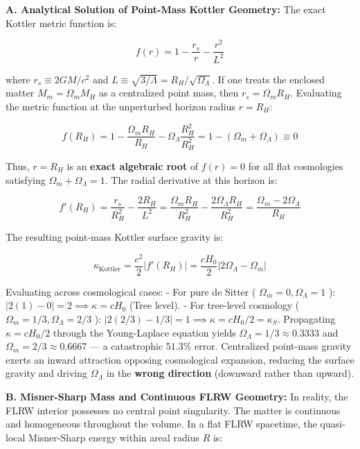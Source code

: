 \documentclass[11pt,a4paper]{article}
\theoremstyle{definition}\newtheorem{definition}{Definition}
\theoremstyle{remark}\newtheorem{remark}{Remark}
\begin{document}
\textbf{A. Analytical Solution of Point-Mass Kottler Geometry:}
The exact Kottler metric function is:


\begin{equation}
f(r) = 1 - \frac{r_s}{r} - \frac{r^2}{L^2}
\end{equation}


where $r_s \equiv 2GM/c^2$ and $L \equiv \sqrt{3/\Lambda} = R_H / \sqrt{\Omega_\Lambda}$. If one treats the enclosed matter $M_m = \Omega_m M_H$ as a centralized point mass, then $r_s = \Omega_m R_H$. Evaluating the metric function at the unperturbed horizon radius $r = R_H$:


\begin{equation}
f(R_H) = 1 - \frac{\Omega_m R_H}{R_H} - \Omega_\Lambda \frac{R_H^2}{R_H^2} = 1 - (\Omega_m + \Omega_\Lambda) \equiv 0
\end{equation}


Thus, $r = R_H$ is an \textbf{exact algebraic root} of $f(r) = 0$ for all flat cosmologies satisfying $\Omega_m + \Omega_\Lambda = 1$. The radial derivative at this horizon is:


\begin{equation}
f'(R_H) = \frac{r_s}{R_H^2} - \frac{2 R_H}{L^2} = \frac{\Omega_m R_H}{R_H^2} - \frac{2 \Omega_\Lambda R_H}{R_H^2} = \frac{\Omega_m - 2\Omega_\Lambda}{R_H}
\end{equation}


The resulting point-mass Kottler surface gravity is:


\begin{equation}
\kappa_{\text{Kottler}} = \frac{c^2}{2} |f'(R_H)| = \frac{c H_0}{2} |2\Omega_\Lambda - \Omega_m|
\end{equation}


Evaluating across cosmological cases:
- For pure de Sitter ( $\Omega_m = 0, \Omega_\Lambda = 1$ ): $|2(1) - 0| = 2 \implies \kappa = c H_0$ (Tree level).
- For tree-level cosmology ( $\Omega_m = 1/3, \Omega_\Lambda = 2/3$ ): $|2(2/3) - 1/3| = 1 \implies \kappa = c H_0 / 2 = \kappa_S$.
Propagating $\kappa = c H_0 / 2$ through the Young-Laplace equation yields $\Omega_\Lambda = 1/3 \approx 0.3333$ and $\Omega_m = 2/3 \approx 0.6667$ — a catastrophic $51.3\%$ error. Centralized point-mass gravity exerts an inward attraction opposing cosmological expansion, reducing the surface gravity and driving $\Omega_\Lambda$ in the \textbf{wrong direction} (downward rather than upward).

\textbf{B. Misner-Sharp Mass and Continuous FLRW Geometry:}
In reality, the FLRW interior possesses no central point singularity. The matter is continuous and homogeneous throughout the volume. In a flat FLRW spacetime, the quasi-local Misner-Sharp energy within areal radius $R$ is:
\end{document}
